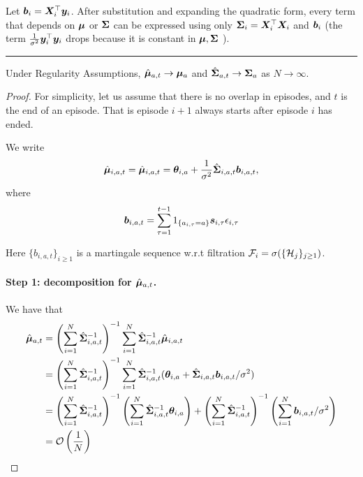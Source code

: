 \documentclass{article}
\begin{document}
Let ${\bm{b}}_i={\bm{X}}_i^{\top} {\bm{y}}_i$. After substitution and expanding the quadratic form, every term that depends on ${\bm{\mu}}$ or ${\bm{\Sigma}}$ can be expressed using only ${\bm{\Sigma}}_i = {\bm{X}}_i^{\top}{\bm{X}}_i$ and ${\bm{b}}_i$ (the term $\frac{1}{\sigma^2} {\bm{y}}_i^{\top} {\bm{y}}_i$ drops because it is constant in ${\bm{\mu}}, {\bm{\Sigma}}$ ). 

\par\noindent\rule{\textwidth}{0.4pt}

\begin{prop}[Consistency]
    Under Regularity Assumptions,
    $\hat {{\bm{\mu}}}_{a, t} \rightarrow {\bm{\mu}}_{a}$ and $\hat {{\bm{\Sigma}}}_{a, t} \rightarrow {\bm{\Sigma}}_{a}$ as $N \rightarrow \infty$.
\end{prop}

\begin{proof}
    For simplicity, let us assume that there is no overlap in episodes, and $t$ is the end of an episode. That is episode $i+1$ always starts after episode $i$ has ended. 
    
    We write 
    \begin{align}
        \hat {{\bm{\mu}}}_{i, a, t} = \hat{{\bm{\mu}}}_{i, a, t}={\bm{\theta}}_{i, a}+\frac{1}{\sigma^2}\hat{{\bm{\Sigma}}}_{i, a, t} {\bm{b}}_{i,a,t},
    \end{align}
    where
    $$
        {\bm{b}}_{i,a,t} = \sum_{\tau=1}^{t-1} 1_{\left\{a_{i, \tau}=a\right\}} {\bm{s}}_{i, \tau} \epsilon_{i, \tau}
    $$

    Here $\{b_{i, a, t}\}_{i \geq 1}$ is a martingale sequence w.r.t filtration ${\mathcal{F}}_i = \sigma(\{{\mathcal{H}}_{j}\}_{j \geq 1})$.
\paragraph{Step 1: decomposition for \(\hat{{\bm{\mu}}}_{a,t}\).}
    We have that 
\begin{align}
        \hat {{\bm{\mu}}}_{a, t} 
        &= \left(\sum_{i = 1}^N \hat {{\bm{\Sigma}}}_{i, a, t}^{-1}\right)^{-1} \sum_{i = 1}^N \hat {{\bm{\Sigma}}}_{i, a, t}^{-1} \hat {{\bm{\mu}}}_{i,a,t}\\
        &= \left(\sum_{i = 1}^N \hat {{\bm{\Sigma}}}_{i, a, t}^{-1}\right)^{-1} \sum_{i = 1}^N \hat {{\bm{\Sigma}}}_{i, a, t}^{-1} ({\bm{\theta}}_{i, a} +  \hat{{\bm{\Sigma}}}_{i, a, t} {\bm{b}}_{i, a, t}/\sigma^2) \\
        &= \left(\sum_{i = 1}^N \hat {{\bm{\Sigma}}}_{i, a, t}^{-1}\right)^{-1} \left(\sum_{i = 1}^N \hat {{\bm{\Sigma}}}_{i, a, t}^{-1} {\bm{\theta}}_{i, a} \right) + \left(\sum_{i = 1}^N \hat {{\bm{\Sigma}}}_{i, a, t}^{-1}\right)^{-1} \left(\sum_{i = 1}^N {\bm{b}}_{i, a, t} / \sigma^2 \right) \\
        &= {\mathcal{O}}\left(\frac{1}{N}\right)
\end{align}


\end{proof}
\end{document}

